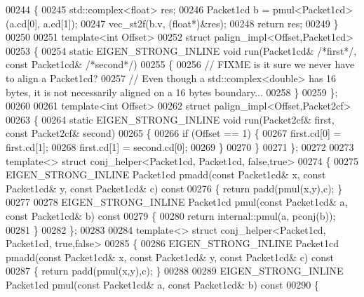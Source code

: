 \begin{DoxyCode}
00244 \{
00245   std::complex<float> res;
00246   Packet1cd b = pmul<Packet1cd>(a.cd[0], a.cd[1]);
00247   vec\_st2f(b.v, (\textcolor{keywordtype}{float}*)&res);
00248   \textcolor{keywordflow}{return} res;
00249 \}
00250 
00251 \textcolor{keyword}{template}<\textcolor{keywordtype}{int} Offset>
00252 \textcolor{keyword}{struct }palign\_impl<Offset,Packet1cd>
00253 \{
00254   \textcolor{keyword}{static} EIGEN\_STRONG\_INLINE \textcolor{keywordtype}{void} run(Packet1cd& \textcolor{comment}{/*first*/}, \textcolor{keyword}{const} Packet1cd& \textcolor{comment}{/*second*/})
00255   \{
00256     \textcolor{comment}{// FIXME is it sure we never have to align a Packet1cd?}
00257     \textcolor{comment}{// Even though a std::complex<double> has 16 bytes, it is not necessarily aligned on a 16 bytes
       boundary...}
00258   \}
00259 \};
00260 
00261 \textcolor{keyword}{template}<\textcolor{keywordtype}{int} Offset>
00262 \textcolor{keyword}{struct }palign\_impl<Offset,Packet2cf>
00263 \{
00264   \textcolor{keyword}{static} EIGEN\_STRONG\_INLINE \textcolor{keywordtype}{void} run(Packet2cf& first, \textcolor{keyword}{const} Packet2cf& second)
00265   \{
00266     \textcolor{keywordflow}{if} (Offset == 1) \{
00267       first.cd[0] = first.cd[1];
00268       first.cd[1] = second.cd[0];
00269     \}
00270   \}
00271 \};
00272 
00273 \textcolor{keyword}{template}<> \textcolor{keyword}{struct }conj\_helper<Packet1cd, Packet1cd, false,true>
00274 \{
00275   EIGEN\_STRONG\_INLINE Packet1cd pmadd(\textcolor{keyword}{const} Packet1cd& x, \textcolor{keyword}{const} Packet1cd& y, \textcolor{keyword}{const} Packet1cd& c)\textcolor{keyword}{ const}
00276 \textcolor{keyword}{  }\{ \textcolor{keywordflow}{return} padd(pmul(x,y),c); \}
00277 
00278   EIGEN\_STRONG\_INLINE Packet1cd pmul(\textcolor{keyword}{const} Packet1cd& a, \textcolor{keyword}{const} Packet1cd& b)\textcolor{keyword}{ const}
00279 \textcolor{keyword}{  }\{
00280     \textcolor{keywordflow}{return} internal::pmul(a, pconj(b));
00281   \}
00282 \};
00283 
00284 \textcolor{keyword}{template}<> \textcolor{keyword}{struct }conj\_helper<Packet1cd, Packet1cd, true,false>
00285 \{
00286   EIGEN\_STRONG\_INLINE Packet1cd pmadd(\textcolor{keyword}{const} Packet1cd& x, \textcolor{keyword}{const} Packet1cd& y, \textcolor{keyword}{const} Packet1cd& c)\textcolor{keyword}{ const}
00287 \textcolor{keyword}{  }\{ \textcolor{keywordflow}{return} padd(pmul(x,y),c); \}
00288 
00289   EIGEN\_STRONG\_INLINE Packet1cd pmul(\textcolor{keyword}{const} Packet1cd& a, \textcolor{keyword}{const} Packet1cd& b)\textcolor{keyword}{ const}
00290 \textcolor{keyword}{  }\{

\end{DoxyCode}
